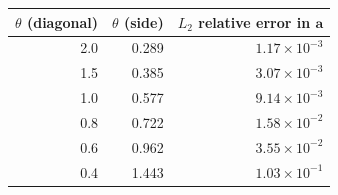 \begin{tabular}{rrr}
\toprule
$\theta$ (diagonal) & $\theta$ (side) & $L_2$ relative error in $\mathbf{a}$ \\
\midrule
2.0 & 0.289 & $1.17\times10^{-3}$ \\
1.5 & 0.385 & $3.07\times10^{-3}$ \\
1.0 & 0.577 & $9.14\times10^{-3}$ \\
0.8 & 0.722 & $1.58\times10^{-2}$ \\
0.6 & 0.962 & $3.55\times10^{-2}$ \\
0.4 & 1.443 & $1.03\times10^{-1}$ \\
\bottomrule
\end{tabular}
